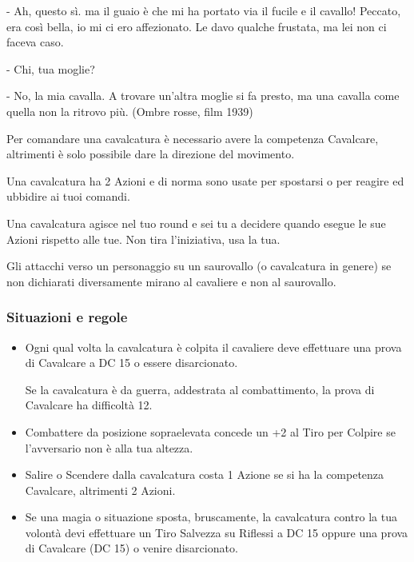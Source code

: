 \begin{multicols}{2}
\begin{changemargin}{0.3cm}{0.3cm}
\begin{enfasi}
{- Ah, questo sì. ma il guaio è che mi ha portato via il fucile e il cavallo! Peccato, era così bella, io mi ci ero affezionato. Le davo qualche frustata, ma lei non ci faceva caso.

- Chi, tua moglie?

- No, la mia cavalla. A trovare un'altra moglie si fa presto, ma una cavalla come quella non la ritrovo più. (Ombre rosse, film 1939)}\end{enfasi}\end{changemargin}\medskip

Per comandare una cavalcatura è necessario avere la competenza Cavalcare, altrimenti è solo possibile dare la direzione del movimento.

Una cavalcatura ha 2 Azioni e di norma sono usate per spostarsi o per reagire ed ubbidire ai tuoi comandi.

Una cavalcatura agisce nel tuo round e sei tu a decidere quando esegue le sue Azioni rispetto alle tue. Non tira l'iniziativa, usa la tua.

Gli attacchi verso un personaggio su un saurovallo (o cavalcatura in genere) se non dichiarati diversamente mirano al cavaliere e non al saurovallo.

\subsubsection{Situazioni e regole}\label{cavallosituazioniregole}

\begin{itemize}[leftmargin=*] \setlength{\itemsep}{0pt}
\item
Ogni qual volta la cavalcatura è colpita il cavaliere deve effettuare una prova di Cavalcare a DC 15 o essere disarcionato.

Se la cavalcatura è da guerra, addestrata al combattimento, la prova di Cavalcare ha difficoltà 12.

\item
Combattere da posizione sopraelevata concede un +2 al Tiro per Colpire se l'avversario non è alla tua altezza.

\item
Salire o Scendere dalla cavalcatura costa 1 Azione se si ha la competenza Cavalcare, altrimenti 2 Azioni.

\item
Se una magia o situazione sposta, bruscamente, la cavalcatura contro la tua volontà devi effettuare un Tiro Salvezza su Riflessi a DC 15 oppure una prova di Cavalcare (DC 15) o venire disarcionato.


\end{itemize}
\end{multicols}
